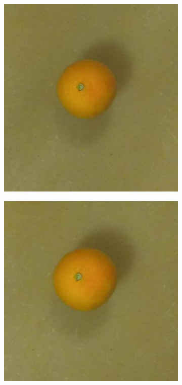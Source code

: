 \documentclass {udthesis}
\begin{document}
\begin{figure}
\begin{subfigure}[]{0.12\textwidth}
      \caption{}
  \end{subfigure}
  \begin{subfigure}[]{0.12\textwidth}
      \includegraphics[width=\textwidth]{orange4_obj_11/orange4_011_28}
      \caption{}
  \end{subfigure}
  \begin{subfigure}[]{0.12\textwidth}
      \includegraphics[width=\textwidth]{orange4_obj_11/orange4_011_26}

\end{subfigure}
\end{figure}
\end{document}

